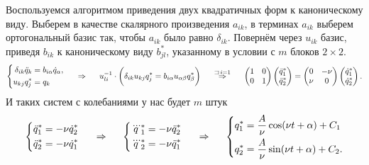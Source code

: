 Воспользуемся алгоритмом приведения двух квадратичных форм к каноническому виду. Выберем в качестве скалярного произведения $a_{ik}$, в терминах $a_{ik}$ выберем ортогональный базис так, чтобы $a_{ik}$ было равно $\delta_{ik}.$ Повернём через $u_{ik}$ базис, приведя $b_{ik}$ к каноническому виду $b^*_{jl}$, указанному в условии с $m$ блоков $2 \times 2$. 
\begin{equation*}
    \left\{\begin{aligned}
        \delta_{ik} \ddot{q}_k &= b_{i\alpha} \dot{q}_\alpha, \\    
        u_{kj} q^*_j &= q_k
    \end{aligned}\right.
    \hspace{0.5cm} \Rightarrow  \hspace{0.5cm}
    u^{-1}_{li} \cdot \left(\vphantom{\frac{1}{2}}
        \delta_{ik} u_{kj} q^*_j= b_{i\alpha} u_{\alpha \beta} q^*_\beta
    \right)
    \hspace{0.5cm} \overset{\sqsupset\, i = 1}{\Rightarrow}  \hspace{0.5cm}
    \begin{pmatrix}
        1 & 0 \\
        0 & 1 \\
    \end{pmatrix} 
    \begin{pmatrix}
        \ddot{q}_1^* \\ \ddot{q}_2^*
    \end{pmatrix} = 
    \begin{pmatrix}
        0 & -\nu \\
        \nu & 0 \\
    \end{pmatrix}
    \begin{pmatrix}
        \dot{q}_1^* \\ \dot{q}_2^*
    \end{pmatrix}.
\end{equation*}
И таких систем с колебаниями у нас будет $m$ штук
\begin{equation*}
    \left\{\begin{aligned}
        \ddot{q}_1^* &= - \nu \dot{q}_2^* \\
        \ddot{q}_2^* &= - \nu \dot{q}_1^* \\
    \end{aligned}\right.
    \hspace{0.5cm} \Rightarrow \hspace{0.5cm}
    \left\{\begin{aligned}
        \dddot{q}_1^* &= - \nu \ddot{q}_2^* \\
        \dddot{q}_2^* &= - \nu \ddot{q}_1^* \\
    \end{aligned}\right.
    \hspace{0.5cm} \Rightarrow \hspace{0.5cm}
    \left\{\begin{aligned}
        q_1^* &= \frac{A}{\nu} \cos (\nu t + \alpha) + C_1 \\
        q_2^* &= \frac{A}{\nu} \sin (\nu t + \alpha) + C_2. \\
    \end{aligned}\right.
\end{equation*}
